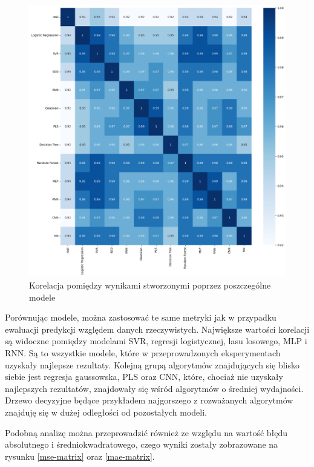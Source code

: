 \begin{figure}[H]
    \centering
    \includegraphics[width=\textwidth]{images/pred_corr.png}
    \caption{Korelacja pomiędzy wynikami stworzonymi poprzez poszczególne modele}
    \label{pred_corr}
\end{figure}

Porównując modele, można zastosować te same metryki jak w przypadku ewaluacji predykcji względem 
danych rzeczywistych. Największe wartości korelacji są widoczne pomiędzy modelami SVR, regresji logistycznej,
lasu losowego, MLP i RNN. Są to wszystkie modele, które w przeprowadzonych eksperymentach uzyskały najlepsze
rezultaty. Kolejną grupą algorytmów znajdujących się blisko siebie jest regresja gaussowska, PLS oraz CNN,
które, chociaż nie uzyskały najlepszych rezultatów, znajdowały się wśród algorytmów o średniej wydajności.
Drzewo decyzyjne będące przykładem najgorszego z rozważanych algorytmów znajduję się w dużej odległości
od pozostałych modeli.

Podobną analizę można przeprowadzić również ze względu na wartość błędu absolutnego i średniokwadratowego,
czego wyniki zostały zobrazowane na rysunku \ref{mse-matrix} oraz \ref{mae-matrix}.

